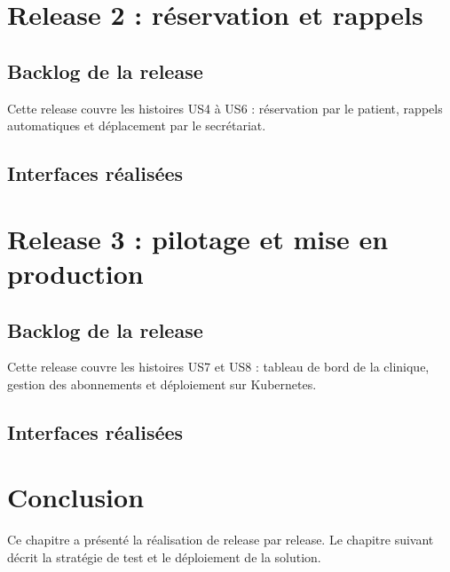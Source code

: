 \section{Release 2 : réservation et rappels}
\subsection{Backlog de la release}
Cette release couvre les histoires US4 à US6 : réservation par le patient, rappels automatiques et déplacement par le secrétariat.

\subsection{Interfaces réalisées}

\section{Release 3 : pilotage et mise en production}
\subsection{Backlog de la release}
Cette release couvre les histoires US7 et US8 : tableau de bord de la clinique, gestion des abonnements et déploiement sur Kubernetes.

\subsection{Interfaces réalisées}

\section*{Conclusion}
Ce chapitre a présenté la réalisation de \nomprojet{} release par release. Le chapitre suivant décrit la stratégie de test et le déploiement de la solution.
